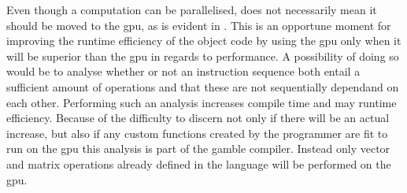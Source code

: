 Even though a computation can be parallelised, does not necessarily mean it should be moved to the \acrshort{gpu}, as is evident in .
This is an opportune moment for improving the runtime efficiency of the object code by using the \acrshort{gpu} only when it will be superior than the gpu in regards to performance.
A possibility of doing so would be to analyse whether or not an instruction sequence both entail a sufficient amount of operations and that these are not sequentially dependand on each other.
Performing such an analysis increases compile time and may runtime efficiency.
Because of the difficulty to discern not only if there will be an actual increase, but also if any custom functions created by the programmer are fit to run on the \acrshort{gpu} this analysis is part of the \gls{gamble} compiler.
Instead only vector and matrix operations already defined in the language will be performed on the \acrshort{gpu}.

